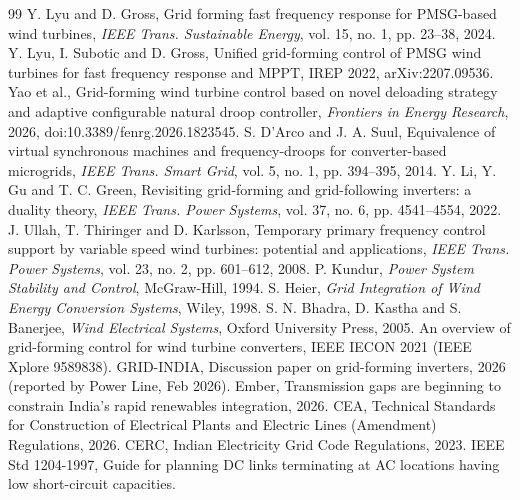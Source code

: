 \documentclass[11pt,a4paper]{article}
\begin{document}
\begin{thebibliography}{99}\small
{} Y. Lyu and D. Gross, Grid forming fast frequency response for PMSG-based wind turbines, \emph{IEEE Trans. Sustainable Energy}, vol. 15, no. 1, pp. 23--38, 2024.
 Y. Lyu, I. Subotic and D. Gross, Unified grid-forming control of PMSG wind turbines for fast frequency response and MPPT, IREP 2022, arXiv:2207.09536.
 Yao et al., Grid-forming wind turbine control based on novel deloading strategy and adaptive configurable natural droop controller, \emph{Frontiers in Energy Research}, 2026, doi:10.3389/fenrg.2026.1823545.
 S. D'Arco and J. A. Suul, Equivalence of virtual synchronous machines and frequency-droops for converter-based microgrids, \emph{IEEE Trans. Smart Grid}, vol. 5, no. 1, pp. 394--395, 2014.
 Y. Li, Y. Gu and T. C. Green, Revisiting grid-forming and grid-following inverters: a duality theory, \emph{IEEE Trans. Power Systems}, vol. 37, no. 6, pp. 4541--4554, 2022.
 J. Ullah, T. Thiringer and D. Karlsson, Temporary primary frequency control support by variable speed wind turbines: potential and applications, \emph{IEEE Trans. Power Systems}, vol. 23, no. 2, pp. 601--612, 2008.
 P. Kundur, \emph{Power System Stability and Control}, McGraw-Hill, 1994.
 S. Heier, \emph{Grid Integration of Wind Energy Conversion Systems}, Wiley, 1998.
 S. N. Bhadra, D. Kastha and S. Banerjee, \emph{Wind Electrical Systems}, Oxford University Press, 2005.
 An overview of grid-forming control for wind turbine converters, IEEE IECON 2021 (IEEE Xplore 9589838).
 GRID-INDIA, Discussion paper on grid-forming inverters, 2026 (reported by Power Line, Feb 2026).
 Ember, Transmission gaps are beginning to constrain India's rapid renewables integration, 2026.
 CEA, Technical Standards for Construction of Electrical Plants and Electric Lines (Amendment) Regulations, 2026.
 CERC, Indian Electricity Grid Code Regulations, 2023.
 IEEE Std 1204-1997, Guide for planning DC links terminating at AC locations having low short-circuit capacities.
\end{thebibliography}
\end{document}
